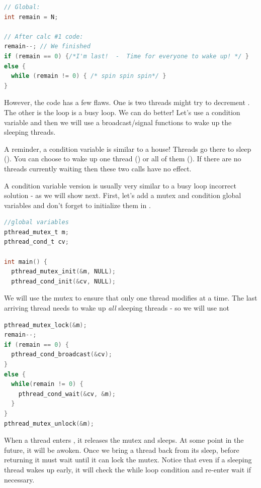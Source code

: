 \begin{lstlisting}[language=C]
// Global:
int remain = N;

// After calc #1 code:
remain--; // We finished
if (remain == 0) {/*I'm last!  -  Time for everyone to wake up! */ }
else {
  while (remain != 0) { /* spin spin spin*/ }
}
\end{lstlisting}

However, the code has a few flaws.
One is two threads might try to decrement .
The other is the loop is a busy loop.
We can do better!
Let's use a condition variable and then we will use a broadcast/signal functions to wake up the sleeping threads.

A reminder, a condition variable is similar to a house! Threads go there to sleep ().
You can choose to wake up one thread () or all of them ().
If there are no threads currently waiting then these two calls have no effect.

A condition variable version is usually very similar to a busy loop incorrect solution - as we will show next.
First, let's add a mutex and condition global variables and don't forget to initialize them in .

\begin{lstlisting}[language=C]
//global variables
pthread_mutex_t m;
pthread_cond_t cv;

int main() {
  pthread_mutex_init(&m, NULL);
  pthread_cond_init(&cv, NULL);
\end{lstlisting}

We will use the mutex to ensure that only one thread modifies  at a time.
The last arriving thread needs to wake up \emph{all} sleeping threads - so we will use  not 

\begin{lstlisting}[language=C]
pthread_mutex_lock(&m);
remain--;
if (remain == 0) {
  pthread_cond_broadcast(&cv);
}
else {
  while(remain != 0) {
    pthread_cond_wait(&cv, &m);
  }
}
pthread_mutex_unlock(&m);
\end{lstlisting}

When a thread enters , it releases the mutex and sleeps.
At some point in the future, it will be awoken.
Once we bring a thread back from its sleep, before returning it must wait until it can lock the mutex.
Notice that even if a sleeping thread wakes up early, it will check the while loop condition and re-enter wait if necessary.

